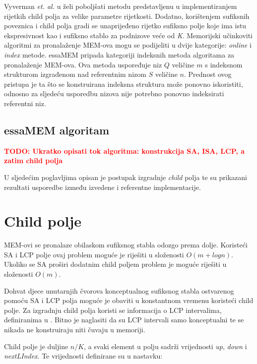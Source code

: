 \documentclass[times, utf8, seminar, numeric]{fer}
\newcommand\todo[1]{\textbf{\textcolor{red}{TODO: #1}}}
\begin{document}
Vyverman \textit{et. al.} u \cite{essa} želi poboljšati metodu predstavljenu u \cite{ssa} implementiranjem rijetkih child polja za velike parametre rijetkosti. Dodatno, korištenjem sufiksnih poveznica  i child polja gradi se unaprijeđeno rijetko sufiksno polje  koje ima istu ekspresivnost kao i sufiksno stablo za podnizove veće od \textit{K}. Memorijski učinkoviti algoritmi za pronalaženje MEM-ova mogu se podijeliti u dvije kategorije: \textit{online} i \textit{index} metode. essaMEM pripada kategoriji indeksnih metoda algoritama za pronalaženje MEM-ova. Ova metoda uspoređuje niz $Q$ veličine $m$ s indeksnom strukturom izgrađenom nad referentnim nizom $S$ veličine $n$. Prednost ovog pristupa je ta što se konstruirana indeksna struktura može ponovno iskoristiti, odnosno za sljedeću usporedbu nizova nije potrebno ponovno indeksirati referentni niz. 

\section{essaMEM algoritam}

\todo{Ukratko opisati tok algoritma: konstrukcija SA, ISA, LCP, a zatim child polja}

U sljedećim poglavljima opisan je postupak izgradnje \textit{child} polja te su prikazani rezultati usporedbe između izvedene i referentne implementacije.

\chapter{Child polje}

MEM-ovi se pronalaze obilaskom sufiksnog stabla odozgo prema dolje. Koristeći SA i LCP polje ovaj problem moguće je riješiti u složenosti $O(m + log n)$. Ukoliko se SA proširi dodatnim child poljem problem je moguće riješiti u složenosti $O(m)$.

Dohvat djece unutarnjih čvorova konceptualnog sufiksnog stabla ostvarenog pomoću SA i LCP polja moguće je obaviti u konstantnom vremenu koristeći child polje. Za izgradnju child polja koristi se informacija o LCP intervalima, definiranima u \citep{esa}. Bitno je naglasiti da su LCP intervali samo konceptualni te se nikada ne konstruiraju niti čuvaju u memoriji.

Child polje je duljine $n / K$, a svaki element u polju sadrži vrijednosti \textit{up}, \textit{down} i \textit{nextLIndex}. Te vrijednosti definirane su u nastavku:
\end{document}
